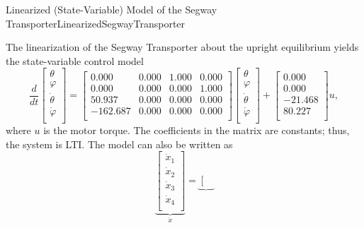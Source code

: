  \begin{factColor}{Linearized (State-Variable) Model of the Segway Transporter}{LinearizedSegwayTransporter}

The linearization of the Segway Transporter about the upright equilibrium yields the state-variable control model
\begin{equation}
    \label{eq:LinearizedSegwayTransporterNoOutputs}
   \frac{d}{dt} \left[
\begin{array}{c}
\theta \\
\varphi \\
\dot{\theta} \\
\dot{\varphi} \\
\end{array}
\right] =
    \left[
\begin{array}{cccc}
0.000 & 0.000 & 1.000 & 0.000 \\
0.000 & 0.000 & 0.000 & 1.000 \\
50.937 & 0.000 & 0.000 & 0.000 \\
-162.687 & 0.000 & 0.000 & 0.000 \\
\end{array}
\right] \left[\begin{array}{c}
\theta \\
\varphi \\
\dot{\theta} \\
\dot{\varphi} \\
\end{array}
\right] + \left[ \begin{array}{r}
0.000 \\
0.000 \\
-21.468 \\
80.227 \\
\end{array}
\right] u,
\end{equation}
where $u$ is the motor torque. The coefficients in the matrix are constants; thus, the system is LTI. The model can also be written as 
\begin{equation}
    \label{eq:LinearizedSegwayTransporterNoOutputs02}
\underbrace{\left[
\begin{array}{c}
\dot{x}_1\\
\dot{x}_2\\
\dot{x}_3 \\
\dot{x}_4 \\
\end{array}
\right]}_{\dot{x}} =
   \underbrace{ \left[
\begin{array}{cccc}

\end{array}}
\end{equation}
\end{factColor}
